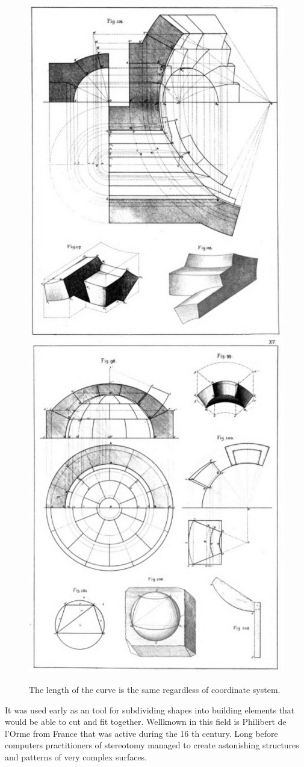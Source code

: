 \begin{figure}[H]
\centering
\includegraphics[width=0.45\linewidth ]{figure/Introduction/NotesonStereotomy.JPG}
\includegraphics[width=0.45\linewidth ]{figure/Introduction/NotesonStereotomy2.JPG}
\caption{The length of the curve is the same regardless of coordinate system.}
\end{figure}

It was used early as an tool for subdividing shapes into building elements that would be able to cut and fit together. Wellknown in this field is Philibert de l'Orme from France that was active during the 16 th century. Long before computers practitioners of stereotomy managed to create astonishing structures and patterns of very complex surfaces.

